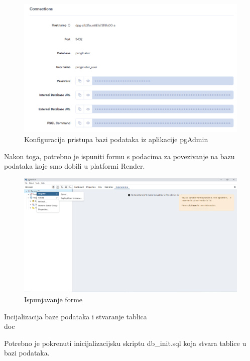 \begin{packed_item}
		\begin{figure}[H]
			\includegraphics[width=\textwidth]{slike/Baza_podataka2.PNG} %
			\caption{Konfiguracija pristupa bazi podataka iz aplikacije pgAdmin}
			\label{fig:bazapodataka2} %
		\end{figure}
		
		Nakon toga, potrebno je ispuniti formu s podacima za povezivanje na bazu podataka koje smo dobili u platformi Render.
		\begin{figure}[H]
			\includegraphics[width=\textwidth]{slike/Baza_podataka3.PNG} %
			\caption{Ispunjavanje forme}
			\label{fig:bazapodataka3} %
		\end{figure}
		
        \item Incijalizacija baze podataka i stvaranje tablica \\doc
        
        Potrebno je pokrenuti inicijalizacijsku skriptu db\_init.sql koja stvara tablice u bazi podataka.

    				
	 \end{packed_item}


